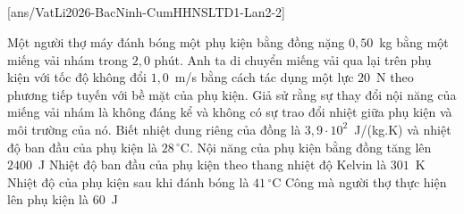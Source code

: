 	\subsection*{}
	\setcounter{ex}{0}
	[ans/VatLi2026-BacNinh-CumHHNSLTD1-Lan2-2]

	\begin{ex}%
		Một người thợ máy đánh bóng một phụ kiện bằng đồng nặng $0{,}50$~kg bằng một miếng vải nhám trong $2{,}0$ phút. Anh ta di chuyển miếng vải qua lại trên phụ kiện với tốc độ không đổi $1{,}0$~m/s bằng cách tác dụng một lực $20$~N theo phương tiếp tuyến với bề mặt của phụ kiện. Giả sử rằng sự thay đổi nội năng của miếng vải nhám là không đáng kể và không có sự trao đổi nhiệt giữa phụ kiện và môi trường của nó. Biết nhiệt dung riêng của đồng là $3{,}9\cdot 10^2$~J/(kg.K) và nhiệt độ ban đầu của phụ kiện là $28\,^\circ\text{C}$.
		\choiceTFt
		{\True Nội năng của phụ kiện bằng đồng tăng lên $2400$~J}
		{\True Nhiệt độ ban đầu của phụ kiện theo thang nhiệt độ Kelvin là $301$~K}
		{Nhiệt độ của phụ kiện sau khi đánh bóng là $41\,^\circ\text{C}$}
		{Công mà người thợ thực hiện lên phụ kiện là $60$~J}
	\end{ex}

